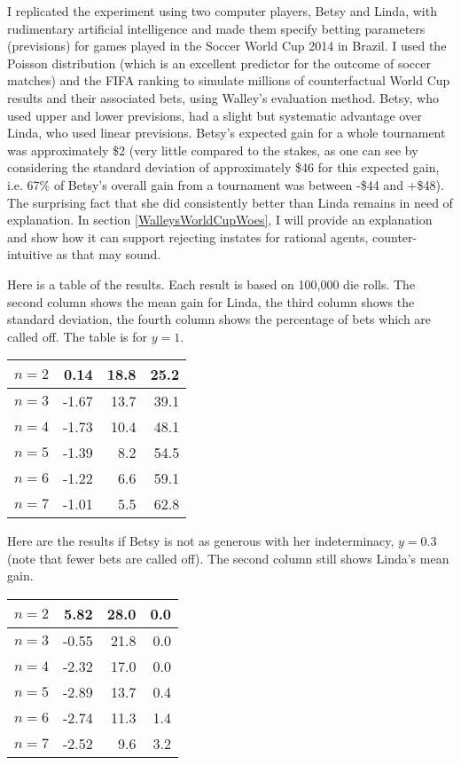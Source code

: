 \documentclass[11pt]{article}
\begin{document}
I replicated the experiment using two computer players, Betsy and
Linda, with rudimentary artificial intelligence and made them specify
betting parameters (previsions) for games played in the Soccer World
Cup 2014 in Brazil. I used the Poisson distribution (which is an
excellent predictor for the outcome of soccer matches) and the FIFA
ranking to simulate millions of counterfactual World Cup results and
their associated bets, using Walley's evaluation method. Betsy, who
used upper and lower previsions, had a slight but systematic advantage
over Linda, who used linear previsions. Betsy's expected gain for a
whole tournament was approximately \$2 (very little compared to the
stakes, as one can see by considering the standard deviation of
approximately \$46 for this expected gain, i.e. 67\% of Betsy's
overall gain from a tournament was between -\$44 and +\$48). The
surprising fact that she did consistently better than Linda remains in
need of explanation. In section \ref{WalleysWorldCupWoes}, I will
provide an explanation and show how it can support rejecting instates
for rational agents, counter-intuitive as that may sound.

Here is a table of the results. Each result is based on
100,000 die rolls. The second column shows the mean gain for Linda,
the third column shows the standard deviation, the fourth column shows
the percentage of bets which are called off. The table is for $y=1$.

\begin{tabular}{|l|r|r|r|}
  \hline
  $n=2$ & 0.14 & 18.8 & 25.2 \\ \hline
  $n=3$ & -1.67 & 13.7 & 39.1 \\ \hline
  $n=4$ & -1.73 & 10.4 & 48.1 \\ \hline
  $n=5$ & -1.39 & 8.2 & 54.5 \\ \hline
  $n=6$ & -1.22 & 6.6 & 59.1 \\ \hline
  $n=7$ & -1.01 & 5.5 & 62.8 \\ \hline
\end{tabular}

Here are the results if Betsy is not as generous with her
indeterminacy, $y=0.3$ (note that fewer bets are called off). The
second column still shows Linda's mean gain.

\begin{tabular}{|l|r|r|r|}
  \hline
  $n=2$ & 5.82 & 28.0 & 0.0 \\ \hline
  $n=3$ & -0.55 & 21.8 & 0.0 \\ \hline
  $n=4$ & -2.32 & 17.0 & 0.0 \\ \hline
  $n=5$ & -2.89 & 13.7 & 0.4 \\ \hline
  $n=6$ & -2.74 & 11.3 & 1.4 \\ \hline
  $n=7$ & -2.52 & 9.6 & 3.2 \\ \hline
\end{tabular}
\end{document}
